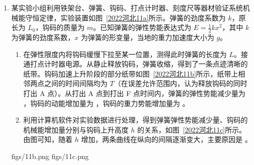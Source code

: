 \documentclass[\gkver]{gaokaozhenti}
\begin{document}
\begin{enumerate}
\item
某实验小组利用铁架台、弹簧、钩码、打点计时器、刻度尺等器材验证系统机械能守恒定律，实验装置如图~\ref{2022河北11a}所示。弹簧的劲度系数为 $k$，原长为 $L_{0}$，钩码的质量为 $m$。已知弹簧的弹性势能表达式为 $E=\frac{1}{2}kx^{2}$，其中 $k$ 为弹簧的劲度系数，$x$ 为弹簧的形变量，当地的重力加速度大小为 $g$。
\begin{enumerate}
	\item
	在弹性限度内将钩码缓慢下拉至某一位置，测得此时弹簧的长度为 $L$。接通打点计时器电源。从静止释放钩码，弹簧收缩，得到了一条点迹清晰的纸带。钩码加速上升阶段的部分纸带如图~\ref{2022河北11b}所示，纸带上相邻两点之间的时间间隔均为 $T$（在误差允许范围内，认为释放钩码的同时打出 A 点）。从打出 A 点到打出 F 点时间内，弹簧的弹性势能减少量为 ，钩码的动能增加量为 ，钩码的重力势能增加量为 。
	\item
	利用计算机软件对实验数据进行处理，得到弹簧弹性势能减少量、钩码的机械能增加量分别与钩码上升高度 $h$ 的关系，如图~\ref{2022河北11c}所示。由图可知，随着 $h$ 增加，两条曲线在纵向的间隔逐渐变大，主要原因是 。
\end{enumerate}

{figs/11b.png}
{figs/11c.png}

\end{enumerate}
\end{document}
